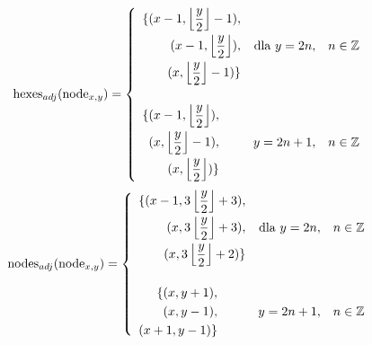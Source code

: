 \documentclass[a4paper,12pt]{article}
\begin{document}
\begin{equation}
  \text{hexes}_{adj}(\text{node}_{x,y})=
  \left\{
    \begin{array}{l r l}
      \begin{aligned}
      \{
      (x-1, \left\lfloor\frac{y}{2}\right\rfloor-1), \\
      (x-1, \left\lfloor\frac{y}{2}\right\rfloor), \\
      (x, \left\lfloor\frac{y}{2}\right\rfloor-1)
      \}
      \end{aligned} & \mbox{dla } y=2n, & n\in\mathbb{Z} \\[40pt]
      \begin{aligned}
        \{
        (x-1, \left\lfloor\frac{y}{2}\right\rfloor), \\
        (x, \left\lfloor\frac{y}{2}\right\rfloor-1), \\
        (x, \left\lfloor\frac{y}{2}\right\rfloor)
        \}
      \end{aligned} & y=2n+1, & n\in\mathbb{Z} \\
    \end{array} \right.
  \label{nodehexes}
\end{equation}
\begin{equation}
  \text{nodes}_{adj}(\text{node}_{x,y})=
  \left\{
    \begin{array}{l r l}
      \begin{aligned}
        \{
        (x-1, 3\left\lfloor\frac{y}{2}\right\rfloor+3), \\
        (x, 3\left\lfloor\frac{y}{2}\right\rfloor+3), \\
        (x, 3\left\lfloor\frac{y}{2}\right\rfloor+2)
        \}
      \end{aligned} & \mbox{dla } y=2n, & n\in\mathbb{Z} \\[40pt]
      \begin{aligned}
        \{
        (x, y+1), \\
        (x, y-1), \\
        (x+1, y-1)
        \}
      \end{aligned} & y=2n+1, & n\in\mathbb{Z} \\
    \end{array} \right.
  \label{nodenodes}
\end{equation}
\end{document}
